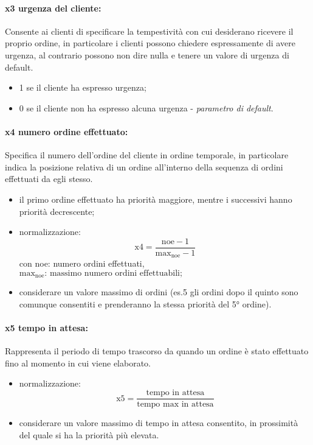 \paragraph{x3 urgenza del cliente:}
Consente ai clienti di specificare la tempestività con cui desiderano ricevere il proprio ordine, in particolare i clienti possono chiedere espressamente di avere urgenza, al contrario possono non dire nulla e tenere un valore di urgenza di default.
\begin{itemize}
	\item 1 se il cliente ha espresso urgenza;
	\item 0 se il cliente non ha espresso alcuna urgenza - \textit{parametro di default}.
\end{itemize}

\paragraph{x4 numero ordine effettuato:}
Specifica il numero dell’ordine del cliente in ordine temporale, in particolare indica la posizione relativa di un ordine all'interno della sequenza di ordini effettuati da egli stesso.
\begin{itemize}
	\item il primo ordine effettuato ha priorità maggiore, mentre i successivi hanno priorità decrescente;
	\item normalizzazione: \begin{equation*}
		\text{x4} = \frac{\text{noe} - 1}{\text{max}_{\text{noe}} - 1}
	\end{equation*} con noe: numero ordini effettuati,\\
	$\text{max}_{\text{noe}} \text{: massimo numero ordini effettuabili;}$
	\item considerare un valore massimo di ordini (es.5 gli ordini dopo il quinto sono comunque consentiti e prenderanno la stessa priorità del 5° ordine).
\end{itemize}

\paragraph{x5 tempo in attesa:}
Rappresenta il periodo di tempo trascorso da quando un ordine è stato effettuato fino al momento in cui viene elaborato.
\begin{itemize}
	\item normalizzazione: \begin{equation*}
		\text{x5} = \frac{\text{tempo in attesa}}{\text{tempo max in attesa}}
	\end{equation*}
	\item considerare un valore massimo di tempo in attesa consentito, in prossimità del quale si ha la priorità più elevata.
\end{itemize}

